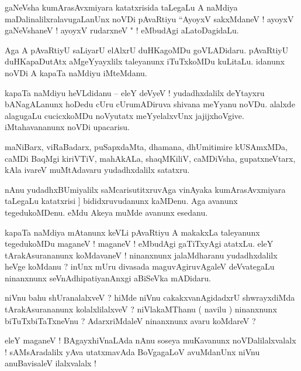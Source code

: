 \documentclass{article}
\begin{document}
\begin{mn}%
gaNeVsha kumArasAvxmiyara katatxrisida taLegaLu A naMdiya maDalinalilxralavugaLanUnx noVDi 
pAvaRtiyu ``AyoyxV sakxMdaneV ! ayoyxV gaNeVshaneV ! ayoyxV rudarxneV " ! eMbudAgi 
aLatoDagidaLu.
\end{mn}

\begin{mn}%
Aga A pAvaRtiyU saLiyarU elAlxrU duHKagoMDu  goVLADidaru. pAvaRtiyU duHKapaDutAtx 
aMgeYyayxlilx taleyanunx iTuTxkoMDu kuLitaLu. idanunx noVDi A kapaTa naMdiyu iMteMdanu.
\end{mn}

\begin{mn}%
kapaTa naMdiyu heVLdidanu -- eleY deVyeV ! yudadhxdalilx deYtayxru bANagALanunx hoDedu cUru 
cUrumADiruva shivana meYyanu noVDu. alalxde alagugaLu cucicxkoMDu noVyutatx meYyelalxvUnx 
jajijxhoVgive. iMtahavananunx noVDi upacarisu.
\end{mn}

\begin{mn}%
maNiBarx, viRaBadarx, puSapxdaMta, dhamana, dhUmitimire kUSAmxMDa, caMDi BaqMgi kiriVTiV, 
mahAkALa, shaqMKiliV, caMDiVsha, gupatxneVtarx, kAla ivareV muMtAdavaru yudadhxdalilx 
satatxru.
\end{mn}

\begin{mn}%
nAnu yudadhxBUmiyalilx saMcarisutitxruvAga vinAyaka kumArasAvxmiyara taLegaLu katatxrisi ]
bididxruvudanunx kaMDenu. Aga avanunx tegedukoMDenu. eMdu Akeya muMde avanunx esedanu.
\end{mn}

\begin{mn}%
kapaTa naMdiya mAtanunx keVLi pAvaRtiyu A makakxLa taleyanunx tegedukoMDu maganeV ! maganeV 
! eMbudAgi gaTiTxyAgi atatxLu. eleY tArakAsurananunx koMdavaneV ! ninanxnunx jalaMdharanu 
yudadhxdalilx heVge koMdanu ? inUnx mUru divasada maguvAgiruvAgaleV deVvategaLu ninanxnunx 
seVnAdhipatiyanAnxgi aBiSeVka mADidaru.
\end{mn}

\begin{mn}%
niVnu bahu shUranalalxveV ? hiMde niVnu cakakxvanAgidadxrU shwrayxdiMda tArakAsurananunx 
kolalxlilalxveV ? niVlakaMThanu ( navilu ) ninanxnunx biTuTxbiTaTxneVnu ? AdarxriMdaleV 
ninanxnunx avaru koMdareV ?
\end{mn}

\begin{mn}%
eleY maganeV ! BAgayxhiVnaLAda nAnu soseya muKavanunx noVDalilalxvalalx ! sAMsAradalilx yAva 
utatxmavAda BoVgagaLoV avuMdanUnx niVnu anuBavisaleV ilalxvalalx !
\end{mn}
\end{document}
